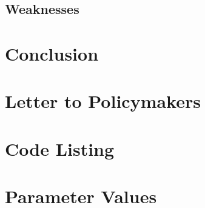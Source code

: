 \documentclass[11pt,letterpaper]{article}
\begin{document}
\subsection{Weaknesses}

\section{Conclusion}





\newpage
\section*{Letter to Policymakers}


\appendix
\section{Code Listing}


\section{Parameter Values}

\end{document}
